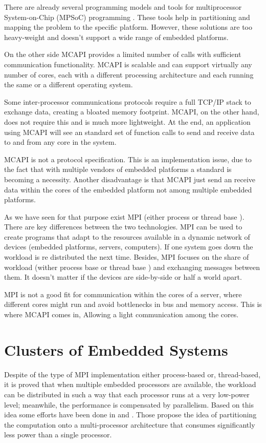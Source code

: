 There are already several programming models and tools for multiprocessor
System-on-Chip (MPSoC) programming \cite{Wolf} \cite{Matilainen}. These tools
help in partitioning and mapping the problem to the specific platform.
However, these solutions are too heavy-weight and doesn't support a wide range
of embedded platforms. 

On the other side MCAPI provides a limited number of calls with sufficient
communication functionality. MCAPI is scalable and can support virtually any
number of cores, each with a different processing architecture and each running
the same or a different operating system.

Some inter-processor communications protocols \cite{Wolf} require a full TCP/IP
stack to exchange data, creating a bloated memory footprint. MCAPI, on the
other hand, does not require this and is much more lightweight. At the end, an
application using MCAPI will see an standard set of function calls to send and
receive data to and from any core in the system. 

MCAPI is not a protocol specification. This
is an implementation issue, due to the fact that with multiple vendors of
embedded platforms a standard is becoming a necessity. Another disadvantage is
that MCAPI just send an receive data within the cores of the embedded platform
not among multiple embedded platforms. 

As we have seen for that purpose exist MPI (either process or thread base ).
There are key differences between the two technologies. MPI can be used to
create programs that adapt to the resources available in a dynamic network of
devices (embedded platforms, servers, computers). If one system goes down the
workload is re distributed the next time. Besides, MPI focuses on the share of
workload (wither process base or thread base ) and exchanging messages between
them. It doesn't matter if the devices are side-by-side or half a world apart. 

MPI is not a good fit for communication within the cores of a
server, where different cores might run and avoid bottlenecks in bus and memory
access. This is where MCAPI comes in, Allowing a light communication among the
cores.

\section{Clusters of Embedded Systems}

Despite of the type of MPI implementation either process-based or,
thread-based, it is proved that when multiple embedded processors are
available, the workload can be distributed in such a way that each processor
runs at a very low-power level; meanwhile, the performance is compensated by
parallelism.  Based on this idea some efforts have been done in \cite{Liu} and
\cite{Weglarz}. Those propose the idea of partitioning the computation onto a
multi-processor architecture that consumes significantly less power than a
single processor.

